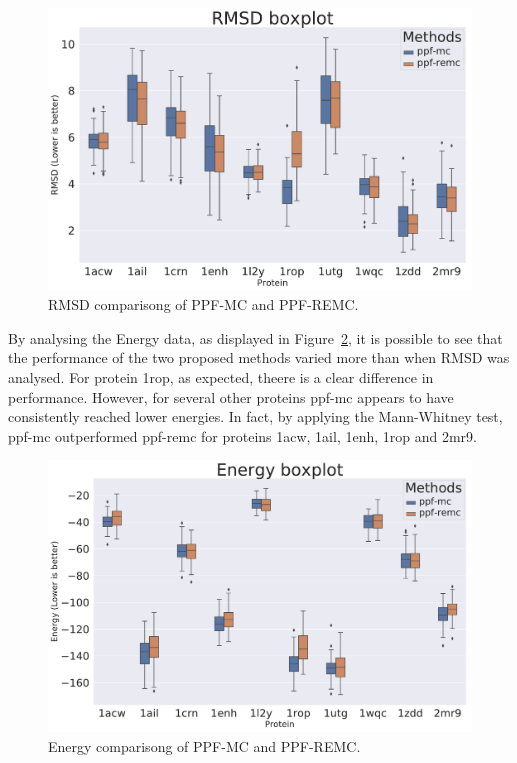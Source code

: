 \begin{figure}
  \centering
  \includegraphics[width=1\textwidth]{Figuras/boxplots/duel_boxplot_best_by_rmsd_rmsd_after.pdf}
  \caption{RMSD comparisong of PPF-MC and PPF-REMC.}
  \label{fig:duel-boxplot-rmsd}
\end{figure}

By analysing the Energy data, as displayed in
Figure~\ref{fig:duel-boxplot-energy}, it is possible to see that the performance
of the two proposed methods varied more than when RMSD was analysed. For protein
1rop, as expected, theere is a clear difference in performance. However, for
several other proteins ppf-mc appears to have consistently reached lower
energies. In fact, by applying the Mann-Whitney test, ppf-mc outperformed
ppf-remc for proteins 1acw, 1ail, 1enh, 1rop and 2mr9.

\begin{figure}
  \centering
  \includegraphics[width=1\textwidth]{Figuras/boxplots/duel_boxplot_best_by_energy_scorefxn}
  \caption{Energy comparisong of PPF-MC and PPF-REMC.}
  \label{fig:duel-boxplot-energy}
\end{figure}

